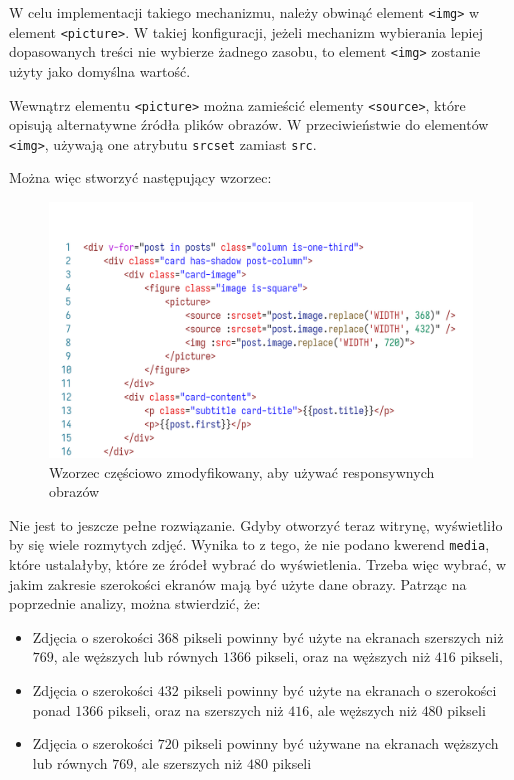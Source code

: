 \documentclass[licencjacka]{pracadypl}
\begin{document}
W celu implementacji takiego mechanizmu, należy obwinąć element \texttt{<img>} w element \texttt{<picture>}. W takiej konfiguracji, jeżeli mechanizm wybierania lepiej dopasowanych treści nie wybierze żadnego zasobu, to element \texttt{<img>} zostanie użyty jako domyślna wartość.

Wewnątrz elementu \texttt{<picture>} można zamieścić elementy \texttt{<source>}, które opisują alternatywne źródła plików obrazów. W przeciwieństwie do elementów \texttt{<img>}, używają one atrybutu \texttt{srcset} zamiast \texttt{src}.

Można więc stworzyć następujący wzorzec:

\begin{figure}[H]
  \includegraphics[width=\linewidth]{images/code-vue-image-card-mid.png}
  \caption{Wzorzec częściowo zmodyfikowany, aby używać responsywnych obrazów}
  \label{fig:code-vue-template-articles-mid}
\end{figure}

Nie jest to jeszcze pełne rozwiązanie. Gdyby otworzyć teraz witrynę, wyświetliło by się wiele rozmytych zdjęć. Wynika to z tego, że nie podano kwerend \texttt{media}, które ustalałyby, które ze źródeł wybrać do wyświetlenia. Trzeba więc wybrać, w jakim zakresie szerokości ekranów mają być użyte dane obrazy. Patrząc na poprzednie analizy, można stwierdzić, że:

\begin{itemize}
  \item Zdjęcia o szerokości $368$ pikseli powinny być użyte na ekranach szerszych niż $769$, ale węższych lub równych $1366$ pikseli, oraz na węższych niż $416$ pikseli,
  \item Zdjęcia o szerokości $432$ pikseli powinny być użyte na ekranach o szerokości ponad $1366$ pikseli, oraz na szerszych niż $416$, ale węższych niż $480$ pikseli
  \item Zdjęcia o szerokości $720$ pikseli powinny być używane na ekranach węższych lub równych $769$, ale szerszych niż $480$ pikseli
\end{itemize}
\end{document}
